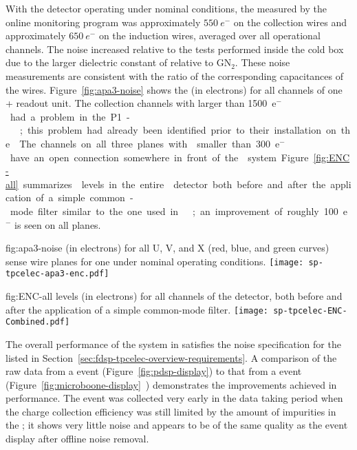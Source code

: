 With the detector operating under nominal
conditions, the 
measured  by the online monitoring program was approximately $\SI{550}{e^-}$ 
on the collection wires and approximately $\SI{650}{e^-}$ on the induction
wires, averaged over all operational channels. The noise increased
relative to the tests performed inside the cold box due to the 
larger dielectric constant of  relative to GN$_2$. 
These noise measurements 
are consistent with the 
ratio of the corresponding capacitances of the  wires. 
Figure~\ref{fig:apa3-noise} 
shows the  (in electrons) for all channels of one 
+ readout unit. 
The collection channels with  larger than \SI{1500}{e$^-$} had a problem 
in the P1- ; this problem had already been identified 
prior to their
installation on the . The channels on all three planes 
with  smaller than \SI{300}{e$^-$} have an open connection somewhere in 
front of the  system. Figure~\ref{fig:ENC-all} summarizes
 levels in the entire  detector both before and
after the application of a simple common-mode filter similar
to the one used in ~\cite{Acciarri:2017sde};
an improvement of roughly 100~e$^-$ is seen on all planes. 

\begin{dunefigure}
{fig:apa3-noise}
{ (in electrons) for all U, V, and X (red, blue, and green curves) sense 
wire planes for one   %
under nominal operating 
conditions.}
\texttt{[image: sp-tpcelec-apa3-enc.pdf]}
\end{dunefigure}

\begin{dunefigure}
{fig:ENC-all}
{ levels (in electrons) for all channels of the  detector, both
before and after the application of a simple common-mode filter.}
\texttt{[image: sp-tpcelec-ENC-Combined.pdf]}
\end{dunefigure}

The overall performance of the  system in 
 satisfies the 
 noise specification %
for the  %
listed in Section~\ref{sec:fdsp-tpcelec-overview-requirements}. 
A comparison of the raw data from 
a  event (Figure~\ref{fig:pdsp-display}) to 
that from a  event (Figure~\ref{fig:microboone-display}~\cite{Acciarri:2017sde}) 
demonstrates the improvements achieved in  performance. 
The  event was collected very early in the data taking
period when the charge collection efficiency was still limited
by the amount of impurities in the ; it shows very little
noise and appears to be of the same quality as the 
event display after offline noise removal. 

